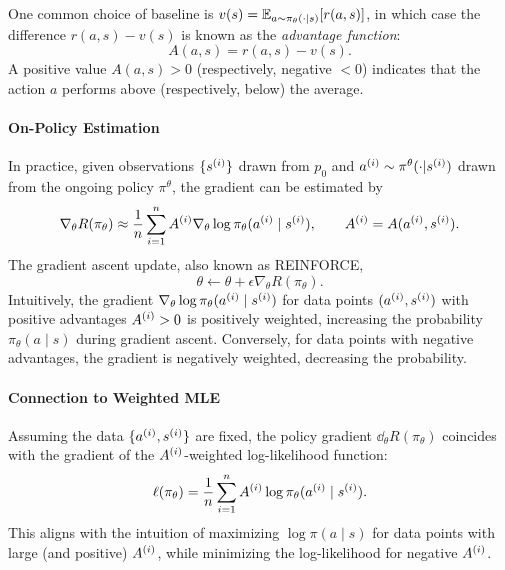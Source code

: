 \documentclass[11pt,letterpaper]{article}
\begin{document}
One common choice of baseline is $v(s) = \mathbb{E}_{a\sim \pi_\theta(\cdot|s)}[r(a,s)]$, in which case the difference $r(a,s) - v(s)$ is known as the \emph{advantage function}:
$$
A(a, s) = r(a,s) - v(s).
$$
A positive value $A(a,s) > 0$ (respectively, negative $<0$) indicates that the action $a$ performs above (respectively, below) the average. 



\paragraph{On-Policy Estimation} 
In practice, given observations $\{s^{(i)}\}$ drawn from $p_0$ and $a^{(i)} \sim \pi^\theta(\cdot|s^{(i)})$ drawn from the ongoing policy $\pi^\theta$, 
the gradient can be estimated by 
\begin{align} \label{equ:onpolicyestimate}
\nabla_\theta  R(\pi_\theta ) 
 \approx \frac{1}{n}\sum_{i=1}^n  
A^{(i)} \nabla_\theta  \log  \pi_\theta (a^{(i)} \mid s^{(i)}),~~~~~~ 
 A^{(i)} =  A(a^{(i)}, s^{(i)}). 
\end{align} 
The gradient ascent update, also known as REINFORCE, 
$$
\theta\gets \theta + \epsilon \nabla_\theta  R(\pi_\theta ).  
$$
Intuitively, the gradient $\nabla_\theta \log \pi_\theta (a^{(i)} \mid s^{(i)})$ for data points $(a^{(i)}, s^{(i)})$ with positive advantages $A^{(i)} > 0$ is positively weighted, increasing the probability $\pi_\theta(a \mid s)$ during gradient ascent. Conversely, for data points with negative advantages, the gradient is negatively weighted, decreasing the probability.  


\paragraph{Connection to Weighted MLE}  
Assuming the data $\{a^{(i)}, s^{(i)}\}$ are fixed, the policy gradient $\dd_\theta R(\pi_\theta)$ coincides with the gradient of the $A^{(i)}$-weighted log-likelihood function:  
$$
\ell(\pi_\theta) = \frac{1}{n} \sum_{i=1}^n A^{(i)} \log \pi_\theta(a^{(i)} \mid s^{(i)}).
$$  
This aligns with the intuition of maximizing $\log \pi(a \mid s)$ for data points with large (and positive) $A^{(i)}$, while minimizing the log-likelihood for negative $A^{(i)}$.  
\end{document}
